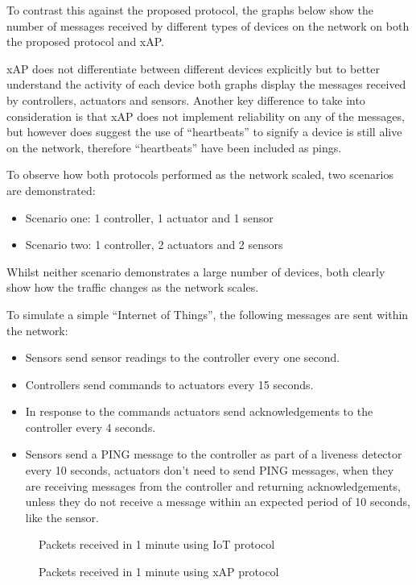 To contrast this against the proposed protocol, the graphs below show the number of messages received by different types of devices on the network on both the proposed protocol and xAP.

xAP does not differentiate between different devices explicitly but to better understand the activity of each device both graphs display the messages received by controllers, actuators and sensors. Another key difference to take into consideration is that xAP does not implement reliability on any of the messages, but however does suggest the use of ``heartbeats'' to signify a device is still alive on the network, therefore ``heartbeats'' have been included as pings.

To observe how both protocols performed as the network scaled, two scenarios are demonstrated:\vspace{-5mm} 
\begin{itemize}
    \item Scenario one: 1 controller, 1 actuator and 1 sensor
    \item Scenario two: 1 controller, 2 actuators and 2 sensors
\end{itemize}
Whilst neither scenario demonstrates a large number of devices, both clearly show how the traffic changes as the network scales.

To simulate a simple ``Internet of Things'', the following messages are sent within the network:\vspace{-5mm} 
\begin{itemize}
    \item Sensors send sensor readings to the controller every one second.
    \item Controllers send commands to actuators every 15 seconds.
    \item In response to the commands actuators send acknowledgements to the controller every 4 seconds.
    \item Sensors send a PING message to the controller as part of a liveness detector every 10 seconds, actuators don't need to send PING messages, when they are receiving messages from the controller and returning acknowledgements, unless they do not receive a message within an expected period of 10 seconds, like the sensor. 
\end{itemize}

\begin{figure}[h]
\begin{center}
\begin{minipage}{.5\textwidth}

\caption{Packets received in 1 minute using IoT protocol}
\label{graph:IoT1}
\end{minipage}%
\begin{minipage}{.5\textwidth}

\caption{Packets received in 1 minute using xAP protocol}
\label{graph:xAP1}
\end{minipage}
\end{center}
\end{figure}


